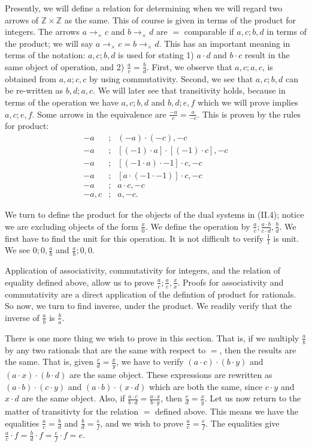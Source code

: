 \documentclass [12pt]{book}
\begin{document}
Presently, we will define a relation for determining when we will regard two arrows of $\mathbb{Z}\times \mathbb{Z}$ as the same. This of course is given in terms of the product for integers. The arrows $a\rightarrow_\times c$ and $b\rightarrow_\times d$ are $=$ comparable if $a,c;b,d$ in terms of the product; we will say $a\rightarrow_{\times}c=b\rightarrow_{\times}d$. This has an important meaning in terms of the notation: $a,c;b,d$ is used for stating 1) $a\cdot d$ and $b\cdot c$ result in the same object of operation, and 2) $\frac ac=\frac bd$. First, we observe that $a,c;a,c$, is obtained from $a,a;c,c$ by using commutativity. Second, we see that $a,c;b,d$ can be re-written as $b,d;a,c$. We will later see that transitivity holds, because in terms of the operation we have $a,c;b,d$ and $b,d;e,f$ which we will prove implies $a,c;e,f$. Some arrows in the equivalence are 
$\frac{-a}c=\frac a{-c}$. This is proven by the rules for product:\begin{eqnarray}\nonumber -a&;&(-a)\cdot(-c),-c\\\nonumber -a&;&[(-1)\cdot a]\cdot[(-1)\cdot c],-c\\\nonumber -a&;&[(-1\cdot a)\cdot -1]\cdot c,-c\\\nonumber-a&;&[a\cdot(-1\cdot -1)]\cdot c,-c\\\nonumber-a&;&a\cdot c,-c\\\nonumber-a,c&;&a,-c.\end{eqnarray}

We turn to define the product for the objects of the dual systems in (II.4); notice we are excluding objects of the form $\frac{x}{0}$. We define the operation by $\frac{a}{c};\frac{a\cdot b}{c\cdot d},\frac{b}{d}$. We first have to find the unit for this operation. It is not difficult to verify $\frac11$ is unit. We see $0;0,\frac ab$ and $\frac ab;0,0$.

Application of associativity, commutativity for integers, and the relation of equality defined above, allow us to prove $\frac{a}{c};\frac{a}{c},\frac{x}{x}$. Proofs for associativity and commutativity are a direct application of the defintion of product for rationals. So now, we turn to find inverse, under the product. We readily verify that the inverse of $\frac{a}{b}$ is $\frac{b}{a}$.

There is one more thing we wish to prove in this section. That is, if we multiply $\frac{a}{b}$ by any two rationals that are the same with respect to $=$, then the results are the same. That is, given $\frac{c}{d}=\frac{x}{y}$, we have to verify $(a\cdot c)\cdot(b\cdot y)$ and $(a\cdot x)\cdot(b\cdot d)$ are the same object. These expressions are rewritten as $(a\cdot b)\cdot(c\cdot y)$ and $(a\cdot b)\cdot(x\cdot d)$ which are both the same, since $c\cdot y$ and $x\cdot d$ are the same object. Also, if $\frac{a\cdot c}{b\cdot d}=\frac{a\cdot x}{b\cdot y}$, then $\frac cd=\frac xy$. Let us now return to the matter of transitivty for the relation $=$ defined above. This means we have the equalities $\frac ac=\frac bd$ and $\frac bd=\frac ef$, and we wish to prove $\frac ac=\frac ef$. The equalities give $\frac ac\cdot f=\frac bd\cdot f=\frac ef\cdot f=e$.
\end{document}
